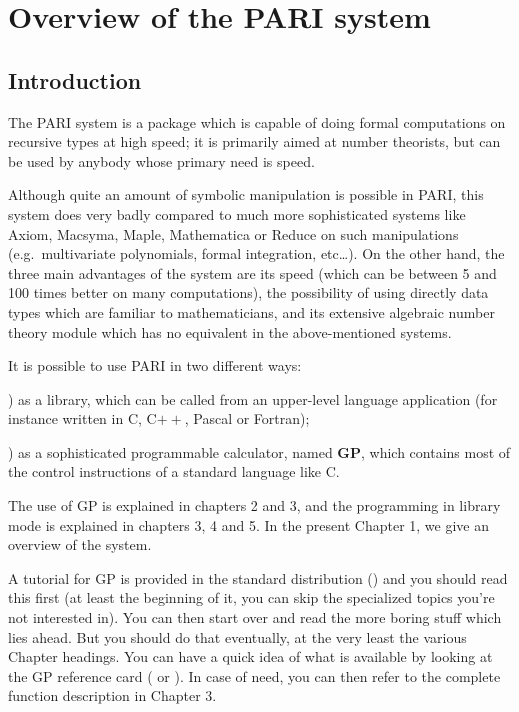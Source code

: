 \chapter{Overview of the PARI system}

\section{Introduction}

\noindent
The PARI system is a package which is capable of doing formal computations
on recursive types at high speed; it is primarily aimed at number
theorists, but can be used by anybody whose primary need is speed.

Although quite an amount of symbolic manipulation is possible in PARI, this
system does very badly compared to much more sophisticated systems like
Axiom, Macsyma, Maple, Mathematica or Reduce on such manipulations
(e.g.~multivariate polynomials, formal integration, etc\dots). On the other
hand, the three main advantages of the system are its speed (which can be
between 5 and 100 times better on many computations), the possibility of
using directly data types which are familiar to mathematicians, and its
extensive algebraic number theory module which has no equivalent in the
above-mentioned systems.

It is possible to use PARI in two different ways:

) as a library, which can be called from an upper-level language
application (for instance written in C, C$++$, Pascal or Fortran);

) as a sophisticated programmable calculator, named {\bf GP}, which
contains most of the control instructions of a standard language like C.

The use of GP is explained in chapters 2 and 3, and the programming in library
mode is explained in chapters 3, 4 and 5. In the present Chapter 1, we give
an overview of the system.

 A tutorial for GP is provided in the standard
distribution () and you should read this first (at
least the beginning of it, you can skip the specialized topics you're not
interested in). You can then start over and read the more boring stuff which
lies ahead. But you should do that eventually, at the very least the various
Chapter headings. You can have a quick idea of what is available by looking
at the GP reference card ( or ). In case
of need, you can then refer to the complete function description in Chapter 3.

